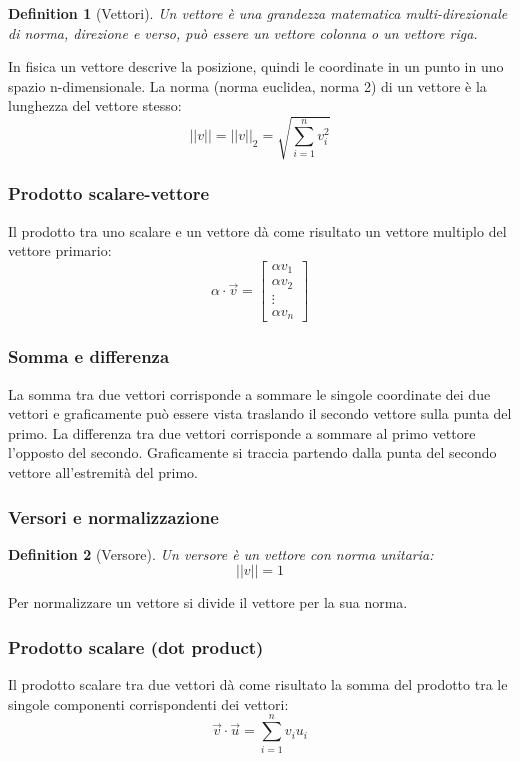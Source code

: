 \documentclass[12pt, a4paper]{article}
\newtheorem{definition}{Definition}[section]
\begin{document}
\begin{definition}[Vettori]
Un vettore è una grandezza matematica multi-direzionale di norma, direzione e verso, può essere un vettore colonna o un vettore riga.
\end{definition}

In fisica un vettore descrive la posizione, quindi le coordinate in un punto in uno spazio n-dimensionale.
La norma (norma euclidea, norma 2) di un vettore è la lunghezza del vettore stesso:
\[
||v|| = ||v||_2 = \sqrt{\sum_{i=1}^n v_i^2}
\]

\subsubsection{Prodotto scalare-vettore}
Il prodotto tra uno scalare e un vettore dà come risultato un vettore multiplo del vettore primario:
\[
\alpha \cdot \vec{v} = \begin{bmatrix} \alpha v_1 \\ \alpha v_2 \\ \vdots \\ \alpha v_n \end{bmatrix}
\]

\subsubsection{Somma e differenza}
La somma tra due vettori corrisponde a sommare le singole coordinate dei due vettori e graficamente può essere vista traslando il secondo vettore sulla punta del primo.
La differenza tra due vettori corrisponde a sommare al primo vettore l'opposto del secondo. Graficamente si traccia partendo dalla punta del secondo vettore all'estremità del primo.

\subsubsection{Versori e normalizzazione}
\begin{definition}[Versore]
Un versore è un vettore con norma unitaria:
\[
||v|| = 1
\]
\end{definition}
Per normalizzare un vettore si divide il vettore per la sua norma.

\subsubsection{Prodotto scalare (dot product)}
Il prodotto scalare tra due vettori dà come risultato la somma del prodotto tra le singole componenti corrispondenti dei vettori:
\[
\vec{v} \cdot \vec{u} = \sum_{i=1}^n v_i u_i
\]
\end{document}
